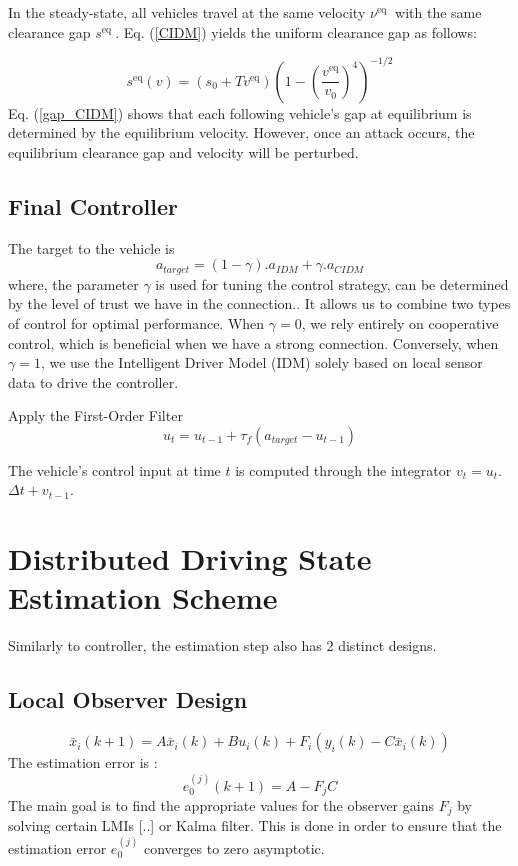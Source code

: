 \documentclass[letterpaper, 10pt, conference]{ieeeconf}  %
\def\eqref#1{(\ref{#1})}
\begin{document}
In the steady-state, all vehicles travel at the same velocity $\nu^{\text {eq }}$ with the same clearance gap $s^{\text {eq }}$. Eq. \eqref{CIDM} yields the uniform clearance gap as follows:

\begin{equation}\label{gap_CIDM}    
s^{\mathrm{eq}}(v)=\left(s_0+T v^{\mathrm{eq}}\right)\left(1-\left(\frac{v^{\mathrm{eq}}}{v_0}\right)^4\right)^{-1 / 2}
\end{equation}
Eq. \eqref{gap_CIDM} shows that each following vehicle's gap at equilibrium is determined by the equilibrium velocity. However, once an
attack occurs, the equilibrium clearance gap and velocity will be perturbed.

\subsection{Final Controller}
The target to the vehicle is 
\begin{equation}
    a_{target} = (1-\gamma). a_{IDM} + \gamma.a_{CIDM} 
\end{equation}
where, the parameter $\gamma$ is used for tuning the control strategy, can be determined by the level of trust we have in the connection.. It allows us to combine two types of control for optimal performance. When $\gamma = 0$, we rely entirely on cooperative control, which is beneficial when we have a strong connection. Conversely, when $\gamma = 1$, we use the Intelligent Driver Model (IDM) solely based on local sensor data to drive the controller. 

Apply the First-Order Filter
\begin{equation}
    u_{t} = u_{t-1} + \tau_{f}(a_{target} - u_{t-1})
\end{equation}

The vehicle's control input at time $t$ is computed through the integrator $v_t= u_{t}$. $\Delta t + v_{t-1}$.


\section{Distributed Driving State Estimation Scheme}
Similarly to controller, the estimation step also has 2 distinct designs. 
\subsection{Local Observer Design}
\begin{equation}\label{observer_dis_plug}
\bar{x}_i(k+1)=A \bar{x}_i(k)+B u_i(k)+F_i(y_i(k)-C \bar{x}_i(k))
\end{equation}
The estimation error is : 
\begin{equation}
e_0^{(j)}(k+1)= A - F_j C
\end{equation}
The main goal is to find the appropriate values for the observer gains $F_j$ by solving certain LMIs [..] or Kalma filter. This is done in order to ensure that the estimation error $e_0^{(j)}$ converges to zero asymptotic. 
\end{document}
